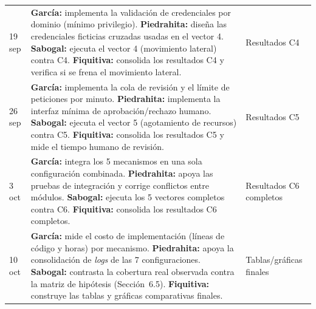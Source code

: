 \documentclass[11pt,letterpaper]{article}
\begin{document}
\begin{center}
\begin{longtable}{@{}p{1.9cm}p{9.9cm}p{2.9cm}@{}}
19 sep &
\textbf{García:} implementa la validación de credenciales por dominio (mínimo privilegio).\newline
\textbf{Piedrahita:} diseña las credenciales ficticias cruzadas usadas en el vector 4.\newline
\textbf{Sabogal:} ejecuta el vector 4 (movimiento lateral) contra C4.\newline
\textbf{Fiquitiva:} consolida los resultados C4 y verifica si se frena el movimiento lateral. &
Resultados C4 \\[4pt]

26 sep &
\textbf{García:} implementa la cola de revisión y el límite de peticiones por minuto.\newline
\textbf{Piedrahita:} implementa la interfaz mínima de aprobación/rechazo humano.\newline
\textbf{Sabogal:} ejecuta el vector 5 (agotamiento de recursos) contra C5.\newline
\textbf{Fiquitiva:} consolida los resultados C5 y mide el tiempo humano de revisión. &
Resultados C5 \\[4pt]

3 oct &
\textbf{García:} integra los 5 mecanismos en una sola configuración combinada.\newline
\textbf{Piedrahita:} apoya las pruebas de integración y corrige conflictos entre módulos.\newline
\textbf{Sabogal:} ejecuta los 5 vectores completos contra C6.\newline
\textbf{Fiquitiva:} consolida los resultados C6 completos. &
Resultados C6 completos \\[4pt]

10 oct &
\textbf{García:} mide el costo de implementación (líneas de código y horas) por mecanismo.\newline
\textbf{Piedrahita:} apoya la consolidación de \emph{logs} de las 7 configuraciones.\newline
\textbf{Sabogal:} contrasta la cobertura real observada contra la matriz de hipótesis (Sección~6.5).\newline
\textbf{Fiquitiva:} construye las tablas y gráficas comparativas finales. &
Tablas/gráficas finales \\[4pt]


\end{longtable}
\end{center}
\end{document}
